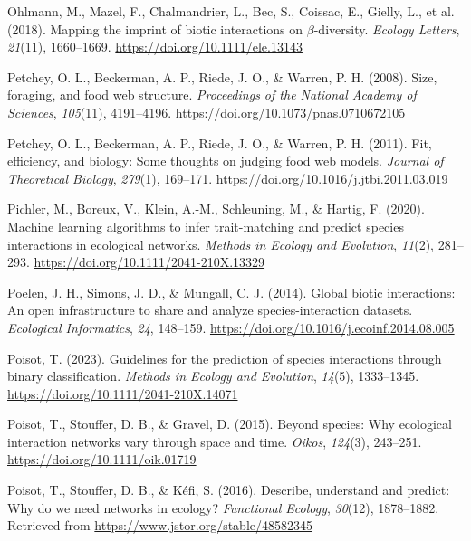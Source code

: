 \documentclass[
]{agujournal2019}
\newlength{\cslhangindent}
\newenvironment{CSLReferences}[2] %
 {\begin{list}{}{%
  \setlength{\itemindent}{0pt}
  \setlength{\leftmargin}{0pt}
  \setlength{\parsep}{0pt}
  \ifodd #1
   \setlength{\leftmargin}{\cslhangindent}
   \setlength{\itemindent}{-1\cslhangindent}
  \fi
  \setlength{\itemsep}{#2\baselineskip}}}
 {\end{list}}
\begin{document}
\begin{CSLReferences}{1}{0}
Ohlmann, M., Mazel, F., Chalmandrier, L., Bec, S., Coissac, E., Gielly,
L., et al. (2018). Mapping the imprint of biotic interactions on
{\(\beta\)}-diversity. \emph{Ecology Letters}, \emph{21}(11),
1660--1669. \url{https://doi.org/10.1111/ele.13143}

Petchey, O. L., Beckerman, A. P., Riede, J. O., \& Warren, P. H. (2008).
Size, foraging, and food web structure. \emph{Proceedings of the
National Academy of Sciences}, \emph{105}(11), 4191--4196.
\url{https://doi.org/10.1073/pnas.0710672105}

Petchey, O. L., Beckerman, A. P., Riede, J. O., \& Warren, P. H. (2011).
Fit, efficiency, and biology: {Some} thoughts on judging food web
models. \emph{Journal of Theoretical Biology}, \emph{279}(1), 169--171.
\url{https://doi.org/10.1016/j.jtbi.2011.03.019}

Pichler, M., Boreux, V., Klein, A.-M., Schleuning, M., \& Hartig, F.
(2020). Machine learning algorithms to infer trait-matching and predict
species interactions in ecological networks. \emph{Methods in Ecology
and Evolution}, \emph{11}(2), 281--293.
\url{https://doi.org/10.1111/2041-210X.13329}

Poelen, J. H., Simons, J. D., \& Mungall, C. J. (2014). Global biotic
interactions: {An} open infrastructure to share and analyze
species-interaction datasets. \emph{Ecological Informatics}, \emph{24},
148--159. \url{https://doi.org/10.1016/j.ecoinf.2014.08.005}

Poisot, T. (2023). Guidelines for the prediction of species interactions
through binary classification. \emph{Methods in Ecology and Evolution},
\emph{14}(5), 1333--1345. \url{https://doi.org/10.1111/2041-210X.14071}

Poisot, T., Stouffer, D. B., \& Gravel, D. (2015). Beyond species: Why
ecological interaction networks vary through space and time.
\emph{Oikos}, \emph{124}(3), 243--251.
\url{https://doi.org/10.1111/oik.01719}

Poisot, T., Stouffer, D. B., \& Kéfi, S. (2016). Describe, understand
and predict: Why do we need networks in ecology? \emph{Functional
Ecology}, \emph{30}(12), 1878--1882. Retrieved from
\url{https://www.jstor.org/stable/48582345}


\end{CSLReferences}
\end{document}
